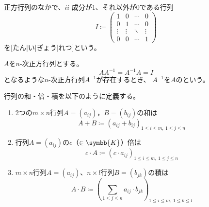 \documentclass[../sotsu.tex]{subfiles}
\begin{document}
\begin{definition}
    正方行列のなかで、$ii$-成分が$1$、それ以外が$0$である行列
    \begin{equation}
        I \coloneq 
        \begin{pmatrix}
            1  &  0  &  \cdots  &  0  \\
            0  &  1  &  \cdots  &  0  \\
            \vdots & \vdots & \ddots & \vdots \\
            0  &  0  &  \cdots  &  1  
        \end{pmatrix}
    \end{equation}
    を[たん|い|ぎょう|れつ]という。
\end{definition}

\begin{definition}
    \label{dfn:inverse-of-matrix}
    $A$を$n$-次正方行列とする。
    \begin{equation}
        A A^{-1} = A^{-1} A = I
    \end{equation}
    となるような$n$-次正方行列$A^{-1}$が存在するとき、
    $A^{-1}$を$A$のという。
\end{definition}


\begin{definition}
    行列の和・倍・積を以下のように定義する。
    \begin{enumerate}
        \item 2つの$m \times n$行列$A = (a_{ij})$，$B = (b_{ij})$の和は
            \begin{equation}
                A + B \coloneq (a_{ij} + b_{ij})_{1 \leq i \leq m, \  1 \leq j \leq n}
            \end{equation}
        \item 行列$A = (a_{ij})$の$c$（$\in \symbb{K}$）倍は
            \begin{equation}
                c \cdotp A \coloneq (c \cdotp a_{ij})_{1 \leq i \leq m, \  1 \leq j \leq n}
            \end{equation}
        \item $m \times n$行列$A = (a_{ij})$、$n \times l$行列$B = (b_{jk})$の積は
            \begin{equation}
                A \cdotp B \coloneq \left( \sum_{1 \leq j \leq n} a_{ij} \cdotp b_{jk} \right)_{1 \leq i \leq m, \  1 \leq k \leq l}
            \end{equation}
    \end{enumerate}
\end{definition}
\end{document}
